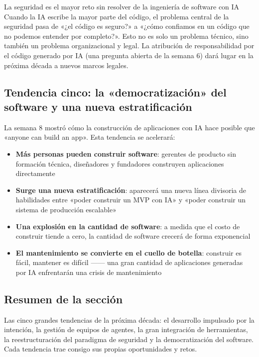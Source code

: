 \documentclass[a4paper]{article}
\begin{document}
\begin{warningbox}{La seguridad es el mayor reto sin resolver de la ingeniería de software con IA}
Cuando la IA escribe la mayor parte del código, el problema central de la seguridad pasa de «¿el código es seguro?» a «¿cómo confiamos en un código que no podemos entender por completo?». Esto no es solo un problema técnico, sino también un problema organizacional y legal. La atribución de responsabilidad por el código generado por IA (una pregunta abierta de la semana 6) dará lugar en la próxima década a nuevos marcos legales.
\end{warningbox}

\subsection{Tendencia cinco: la «democratización» del software y una nueva estratificación}

La semana 8 mostró cómo la construcción de aplicaciones con IA hace posible que «anyone can build an app». Esta tendencia se acelerará:

\begin{itemize}
    \item \textbf{Más personas pueden construir software}: gerentes de producto sin formación técnica, diseñadores y fundadores construyen aplicaciones directamente
    \item \textbf{Surge una nueva estratificación}: aparecerá una nueva línea divisoria de habilidades entre «poder construir un MVP con IA» y «poder construir un sistema de producción escalable»
    \item \textbf{Una explosión en la cantidad de software}: a medida que el costo de construir tiende a cero, la cantidad de software crecerá de forma exponencial
    \item \textbf{El mantenimiento se convierte en el cuello de botella}: construir es fácil, mantener es difícil —— una gran cantidad de aplicaciones generadas por IA enfrentarán una crisis de mantenimiento
\end{itemize}

\subsection{Resumen de la sección}

Las cinco grandes tendencias de la próxima década: el desarrollo impulsado por la intención, la gestión de equipos de agentes, la gran integración de herramientas, la reestructuración del paradigma de seguridad y la democratización del software. Cada tendencia trae consigo sus propias oportunidades y retos.
\end{document}
